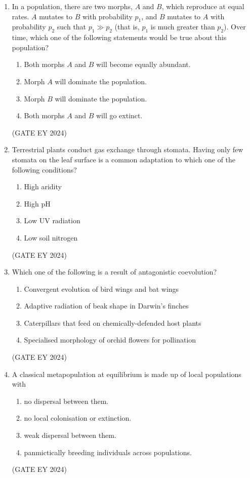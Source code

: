 \documentclass[journal]{IEEEtran}
\begin{document}
\begin{enumerate}
\item In a population, there are two morphs, $A$ and $B$, which reproduce at equal rates. $A$ mutates to $B$ with probability $p_1$, and $B$ mutates to $A$ with probability $p_2$ such that $p_1 \gg p_2$ (that is, $p_1$ is much greater than $p_2$). Over time, which one of the following statements would be true about this population?
    \begin{enumerate}
        \item Both morphs $A$ and $B$ will become equally abundant.
        \item Morph $A$ will dominate the population.
        \item Morph $B$ will dominate the population.
        \item Both morphs $A$ and $B$ will go extinct.
    \end{enumerate}
\hfill{(GATE EY 2024)}

\item Terrestrial plants conduct gas exchange through stomata. Having only few stomata on the leaf surface is a common adaptation to which one of the following conditions?
    \begin{multicols}{2}
    \begin{enumerate}
        \item High aridity
        \item High pH
        \item Low UV radiation
        \item Low soil nitrogen
    \end{enumerate}
    \end{multicols}
\hfill{(GATE EY 2024)}

\item Which one of the following is a result of antagonistic coevolution?
    \begin{enumerate}
        \item Convergent evolution of bird wings and bat wings
        \item Adaptive radiation of beak shape in Darwin's finches
        \item Caterpillars that feed on chemically-defended host plants
        \item Specialised morphology of orchid flowers for pollination
    \end{enumerate}
\hfill{(GATE EY 2024)}

\item A classical metapopulation at equilibrium is made up of local populations with
    \begin{enumerate}
        \item no dispersal between them.
        \item no local colonisation or extinction.
        \item weak dispersal between them.
        \item panmictically breeding individuals across populations.
    \end{enumerate}
\hfill{(GATE EY 2024)}


\end{enumerate}
\end{document}
